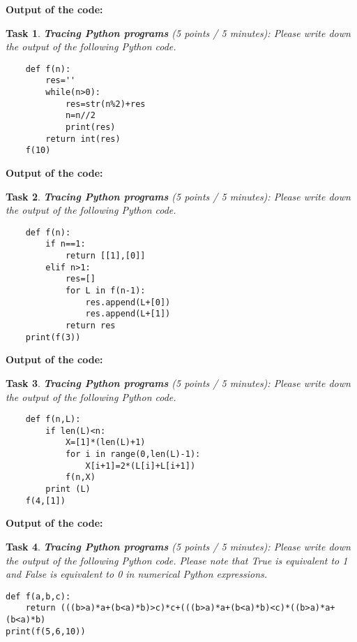 \documentclass[UTF8]{ctexart}
\newtheorem{task}{Task}
\begin{document}
\noindent
\textbf{Output of the code:}
\vspace{1cm}

\begin{task}
{\textbf{Tracing Python programs}} (5 points / 5 minutes): Please write down the output of the following Python code.
\end{task}
\begin{verbatim}
    def f(n):
        res=''
        while(n>0):
            res=str(n%2)+res
            n=n//2
            print(res)
        return int(res)
    f(10)
\end{verbatim}

\noindent
\textbf{Output of the code:}
\vspace{2cm}

\begin{task}
{\textbf{Tracing Python programs}} (5 points / 5 minutes): Please write down the output of the following Python code.
\end{task}
\begin{verbatim}
    def f(n):
        if n==1:
            return [[1],[0]]
        elif n>1:
            res=[]
            for L in f(n-1):
                res.append(L+[0])
                res.append(L+[1])
            return res
    print(f(3))
\end{verbatim}

\noindent
\textbf{Output of the code:}
\vspace{1cm}

\newpage
\begin{task}
{\textbf{Tracing Python programs}} (5 points / 5 minutes): Please write down the output of the following Python code.
\end{task}

\begin{verbatim}
    def f(n,L):
        if len(L)<n:
            X=[1]*(len(L)+1)
            for i in range(0,len(L)-1):
                X[i+1]=2*(L[i]+L[i+1])
            f(n,X)
        print (L)
    f(4,[1])
\end{verbatim}

\noindent
\textbf{Output of the code:}

\vspace{2cm}

\begin{task}
{\textbf{Tracing Python programs}} (5 points / 5 minutes): Please write down the output of the following Python code. Please note that True is equivalent to 1 and False is equivalent to 0 in numerical Python expressions.
\end{task}
\begin{verbatim}
def f(a,b,c):
    return (((b>a)*a+(b<a)*b)>c)*c+(((b>a)*a+(b<a)*b)<c)*((b>a)*a+(b<a)*b)
print(f(5,6,10))
\end{verbatim}
\end{document}
